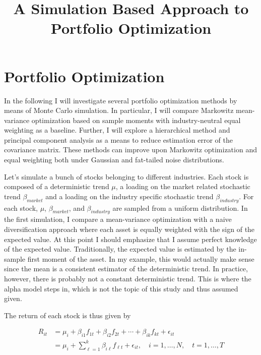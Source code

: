 \documentclass[11pt]{article}
\title{A Simulation Based Approach to Portfolio Optimization}
\begin{document}
    
    
    \maketitle
    
    

    
    \hypertarget{portfolio-optimization}{%
\section{Portfolio Optimization}\label{portfolio-optimization}}

    In the following I will investigate several portfolio optimization
methods by means of Monte Carlo simulation. In particular, I will
compare Markowitz mean-variance optimization based on sample moments
with industry-neutral equal weighting as a baseline. Further, I will
explore a hierarchical method and principal component analysis as a
means to reduce estimation error of the covariance matrix. These methods
can improve upon Markowitz optimization and equal weighting both under
Gaussian and fat-tailed noise distributions.

Let's simulate a bunch of stocks belonging to different industries. Each
stock is composed of a deterministic trend \(\mu\), a loading on the
market related stochastic trend \(\beta_{market}\) and a loading on the
industry specific stochastic trend \(\beta_{industry}\). For each stock,
\(\mu\), \(\beta_{market}\), and \(\beta_{industry}\) are sampled from a
uniform distribution. In the first simulation, I compare a mean-variance
optimization with a naive diversification approach where each asset is
equally weighted with the sign of the expected value. At this point I
should emphasize that I assume perfect knowledge of the expected value.
Traditionally, the expected value is estimated by the in-sample first
moment of the asset. In my example, this would actually make sense since
the mean is a consistent estimator of the deterministic trend. In
practice, however, there is probably not a constant deterministic trend.
This is where the alpha model steps in, which is not the topic of this
study and thus assumed given.

The return of each stock is thus given by

\[\begin{aligned} R_{i t} &=\mu_{i}+\beta_{i 1} f_{1 t}+\beta_{i 2} f_{2 t}+\cdots+\beta_{i k} f_{k t}+\epsilon_{i t} \\ &=\mu_{i}+\sum_{\ell=1}^{k} \beta_{i \ell} f_{\ell t}+\epsilon_{i t}, \quad i=1, \ldots, N, \quad t=1, \ldots, T \end{aligned}\]
\end{document}
